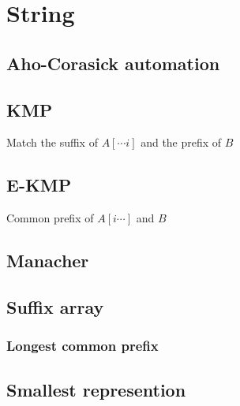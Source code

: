 \section{String}
\subsection{Aho-Corasick automation}


\subsection{KMP}
Match the suffix of $A[\cdots i]$ and the prefix of $B$


\subsection{E-KMP}
Common prefix of $A[i\cdots]$ and $B$


\subsection{Manacher}


\subsection{Suffix array}

\subsubsection{Longest common prefix}


\subsection{Smallest represention}

